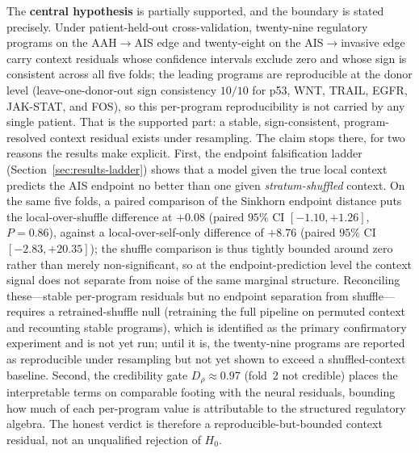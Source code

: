The \textbf{central hypothesis} is partially supported, and the boundary is stated precisely. Under
patient-held-out cross-validation, twenty-nine regulatory programs on the AAH$\rightarrow$AIS edge and
twenty-eight on the AIS$\rightarrow$invasive edge carry context residuals whose confidence intervals
exclude zero and whose sign is consistent across all five folds; the leading programs are reproducible
at the donor level (leave-one-donor-out sign consistency $10/10$ for p53, WNT, TRAIL, EGFR, JAK-STAT,
and FOS), so this per-program reproducibility is not carried by any single patient. That is the
supported part: a stable, sign-consistent, program-resolved context residual exists under resampling.
The claim stops there, for two reasons the results make explicit. First, the endpoint falsification
ladder (Section~\ref{sec:results-ladder}) shows that a model given the true local context predicts the AIS
endpoint no better than one given \emph{stratum-shuffled} context. On the same five folds, a paired
comparison of the Sinkhorn endpoint distance puts the local-over-shuffle difference at
$+0.08$ (paired $95\%$ CI $[-1.10, +1.26]$, $P = 0.86$), against a local-over-self-only difference of
$+8.76$ (paired $95\%$ CI $[-2.83, +20.35]$); the shuffle comparison is thus tightly bounded around
zero rather than merely non-significant, so at the endpoint-prediction level the context signal does
not separate from noise of the same marginal structure. Reconciling these---stable per-program residuals but no endpoint separation
from shuffle---requires a retrained-shuffle null (retraining the full pipeline on permuted context and
recounting stable programs), which is identified as the primary confirmatory experiment and is not yet
run; until it is, the twenty-nine programs are reported as reproducible under resampling but not yet
shown to exceed a shuffled-context baseline. Second, the credibility gate $D_{\rho} \approx 0.97$
(fold~2 not credible) places the interpretable terms on comparable footing with the neural residuals,
bounding how much of each per-program value is attributable to the structured regulatory algebra. The
honest verdict is therefore a reproducible-but-bounded context residual, not an unqualified rejection
of $H_0$.

